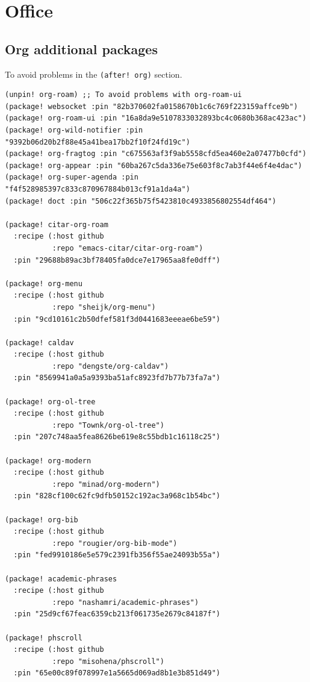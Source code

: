 \documentclass[11pt]{article}
\begin{document}
\section{Office}
\label{sec:orgcb10654}
\subsection{Org additional packages}
\label{sec:org9e071f8}
To avoid problems in the \texttt{(after! org)} section.

\begin{verbatim}
(unpin! org-roam) ;; To avoid problems with org-roam-ui
(package! websocket :pin "82b370602fa0158670b1c6c769f223159affce9b")
(package! org-roam-ui :pin "16a8da9e5107833032893bc4c0680b368ac423ac")
(package! org-wild-notifier :pin "9392b06d20b2f88e45a41bea17bb2f10f24fd19c")
(package! org-fragtog :pin "c675563af3f9ab5558cfd5ea460e2a07477b0cfd")
(package! org-appear :pin "60ba267c5da336e75e603f8c7ab3f44e6f4e4dac")
(package! org-super-agenda :pin "f4f528985397c833c870967884b013cf91a1da4a")
(package! doct :pin "506c22f365b75f5423810c4933856802554df464")

(package! citar-org-roam
  :recipe (:host github
           :repo "emacs-citar/citar-org-roam")
  :pin "29688b89ac3bf78405fa0dce7e17965aa8fe0dff")

(package! org-menu
  :recipe (:host github
           :repo "sheijk/org-menu")
  :pin "9cd10161c2b50dfef581f3d0441683eeeae6be59")

(package! caldav
  :recipe (:host github
           :repo "dengste/org-caldav")
  :pin "8569941a0a5a9393ba51afc8923fd7b77b73fa7a")

(package! org-ol-tree
  :recipe (:host github
           :repo "Townk/org-ol-tree")
  :pin "207c748aa5fea8626be619e8c55bdb1c16118c25")

(package! org-modern
  :recipe (:host github
           :repo "minad/org-modern")
  :pin "828cf100c62fc9dfb50152c192ac3a968c1b54bc")

(package! org-bib
  :recipe (:host github
           :repo "rougier/org-bib-mode")
  :pin "fed9910186e5e579c2391fb356f55ae24093b55a")

(package! academic-phrases
  :recipe (:host github
           :repo "nashamri/academic-phrases")
  :pin "25d9cf67feac6359cb213f061735e2679c84187f")

(package! phscroll
  :recipe (:host github
           :repo "misohena/phscroll")
  :pin "65e00c89f078997e1a5665d069ad8b1e3b851d49")
\end{verbatim}
\end{document}
